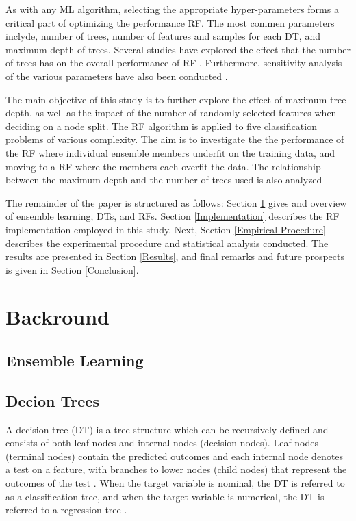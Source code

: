 \documentclass[conference]{IEEEtran}
\begin{document}
    As with any ML algorithm, selecting the appropriate hyper-parameters forms a critical part of optimizing the performance
    RF. The most commen parameters inclyde, number of trees, number of features and samples for each DT, and maximum depth
    of trees. Several studies have explored the effect that the number of trees has on the overall performance of RF
    \cite{banfeld2007comparison,hernandezlobato2013large,oshiro2012how}. Furthermore, sensitivity analysis of the various
    parameters have also been conducted \cite{probst2018tune,freeman2015random,huang2016parameter}.

    The main objective of this study is to further explore the effect of maximum tree depth, as well as the impact
    of the number of randomly selected features when deciding on a node split. The RF algorithm is applied to five classification
    problems of various complexity. The aim is to investigate the the performance of the RF where individual ensemble members
    underfit on the training data, and moving to a RF where the members each overfit the data. The relationship between the maximum
    depth and the number of trees used is also analyzed

    The remainder of the paper is structured as follows: Section \ref{Backround} gives and overview of ensemble learning,
    DTs, and RFs. Section \ref{Implementation} describes the RF implementation employed in this study. Next, Section \ref{Empirical-Procedure}
    describes the experimental procedure and statistical analysis conducted. The results are presented in Section \ref{Results}, and final
    remarks and future prospects is given in Section \ref{Conclusion}.

\section{Backround} \label{Backround}

    \subsection{Ensemble Learning}



    \subsection{Decion Trees}

        A decision tree (DT) is a tree structure which can be recursively defined and consists of both leaf nodes
        and internal nodes (decision nodes). Leaf nodes (terminal nodes) contain the predicted outcomes and each internal
        node denotes a test on a feature, with branches to lower nodes (child nodes) that represent the outcomes of the
        test \cite{DT_Rokach2010, GavinPotgieter}. When the target variable is nominal, the DT is referred to as a classification
        tree, and when the target variable is numerical, the DT is referred to a regression tree \cite{DT_Kotsiantis2013, DT_Blockeel2023}.
\end{document}
